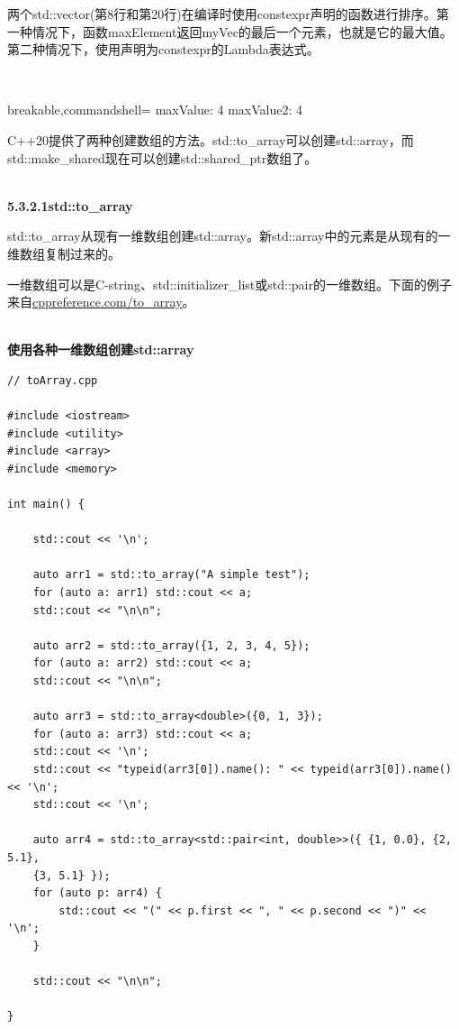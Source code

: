 两个std::vector(第8行和第20行)在编译时使用constexpr声明的函数进行排序。第一种情况下，函数maxElement返回myVec的最后一个元素，也就是它的最大值。第二种情况下，使用声明为constexpr的Lambda表达式。

\hspace*{\fill} \\ %
\begin{tcblisting}{breakable,commandshell={}}
maxValue: 4
maxValue2: 4
\end{tcblisting}


C++20提供了两种创建数组的方法。std::to\_array可以创建std::array，而std::make\_shared现在可以创建std::shared\_ptr数组了。

\hspace*{\fill} \\ %
\noindent
\textbf{5.3.2.1\hspace{0.2cm}std::to\_array}

std::to\_array从现有一维数组创建std::array。新std::array中的元素是从现有的一维数组复制过来的。

一维数组可以是C-string、std::initializer\_list或std::pair的一维数组。下面的例子来自\href{https://en.cppreference.com/w/cpp/container/array/to_array}{cppreference.com/to\_array}。

\hspace*{\fill} \\ %
\noindent
\textbf{使用各种一维数组创建std::array}
\begin{lstlisting}[style=styleCXX]
// toArray.cpp

#include <iostream>
#include <utility>
#include <array>
#include <memory>

int main() {

	std::cout << '\n';
	
	auto arr1 = std::to_array("A simple test");
	for (auto a: arr1) std::cout << a;
	std::cout << "\n\n";
	
	auto arr2 = std::to_array({1, 2, 3, 4, 5});
	for (auto a: arr2) std::cout << a;
	std::cout << "\n\n";
	
	auto arr3 = std::to_array<double>({0, 1, 3});
	for (auto a: arr3) std::cout << a;
	std::cout << '\n';
	std::cout << "typeid(arr3[0]).name(): " << typeid(arr3[0]).name() << '\n';
	std::cout << '\n';
	
	auto arr4 = std::to_array<std::pair<int, double>>({ {1, 0.0}, {2, 5.1},
	{3, 5.1} });
	for (auto p: arr4) {
		std::cout << "(" << p.first << ", " << p.second << ")" << '\n';
	}
	
	std::cout << "\n\n";

}
\end{lstlisting}

